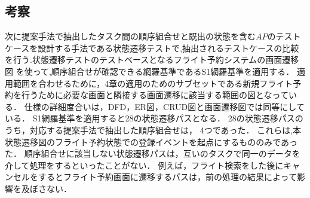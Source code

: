 \documentclass[a4paper,10pt]{jreport}
\begin{document}
%
%


\subsection{考察}
次に提案手法で抽出したタスク間の順序組合せと既出の状態を含む$AP$のテストケースを設計する手法である状態遷移テストで,抽出されるテストケースの比較を行う.状態遷移テストのテストベースとなるフライト予約システムの画面遷移図
を使って,順序組合せが確認できる網羅基準であるS1網羅基準を適用する．
適用範囲を合わせるために，4章の適用のためのサブセットである新規フライト予約を行うために必要な画面と隣接する画面遷移に該当する範囲の図となっている．
仕様の詳細度合いは，DFD，ER図，CRUD図と画面遷移図では同等にしている．
S1網羅基準を適用すると28の状態遷移パスとなる．
28の状態遷移パスのうち，対応する提案手法で抽出した順序組合せは，
4つであった．
これらは,本状態遷移図のフライト予約状態での登録イベントを起点にするもののみであった．
順序組合せに該当しない状態遷移パスは，互いのタスクで同一のデータを介して処理をするといったことがない．
例えば，フライト検索をした後にキャンセルをするとフライト予約画面に遷移するパスは，前の処理の結果によって影響を及ぼさない．
\end{document}
